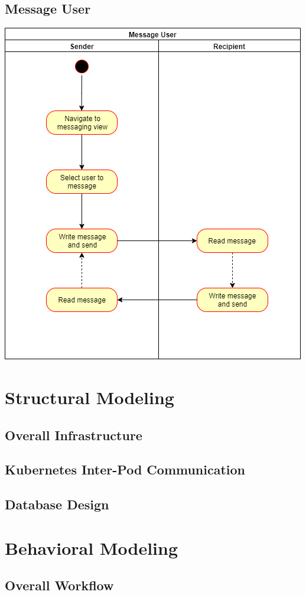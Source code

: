 \documentclass[12pt]{article}
\begin{document}
    \subsection{Message User}
    \begin{center}\includegraphics[width=\textwidth]{images/MessageUser.png}\end{center}

\section{Structural Modeling}
    \subsection{Overall Infrastructure}

    \subsection{Kubernetes Inter-Pod Communication}

    \subsection{Database Design}

\section{Behavioral Modeling}

    \subsection{Overall Workflow}
\end{document}

